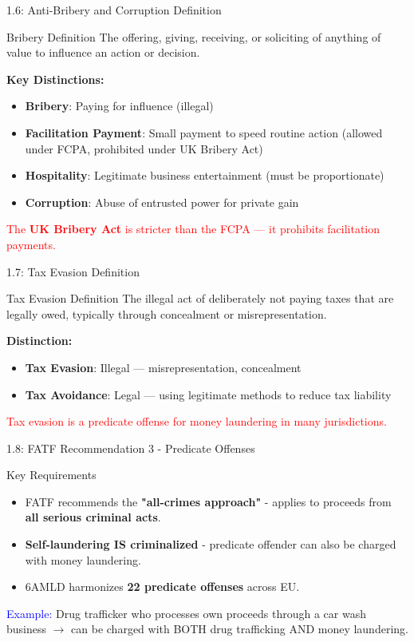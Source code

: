 \documentclass{beamer}
\begin{document}
	\begin{frame}{1.6: Anti-Bribery and Corruption Definition}
		\begin{block}{Bribery Definition}
			The offering, giving, receiving, or soliciting of anything of value to influence an action or decision.
		\end{block}
		\textbf{Key Distinctions:}
		\begin{itemize}
			\item \textbf{Bribery}: Paying for influence (illegal)
			\item \textbf{Facilitation Payment}: Small payment to speed routine action (allowed under FCPA, prohibited under UK Bribery Act)
			\item \textbf{Hospitality}: Legitimate business entertainment (must be proportionate)
			\item \textbf{Corruption}: Abuse of entrusted power for private gain
		\end{itemize}
		\textcolor{red}{The \textbf{UK Bribery Act} is stricter than the FCPA — it prohibits facilitation payments.}
	\end{frame}
	
	\begin{frame}{1.7: Tax Evasion Definition}
		\begin{block}{Tax Evasion Definition}
			The illegal act of deliberately not paying taxes that are legally owed, typically through concealment or misrepresentation.
		\end{block}
		\textbf{Distinction:}
		\begin{itemize}
			\item \textbf{Tax Evasion}: Illegal — misrepresentation, concealment
			\item \textbf{Tax Avoidance}: Legal — using legitimate methods to reduce tax liability
		\end{itemize}
		\textcolor{red}{Tax evasion is a predicate offense for money laundering in many jurisdictions.}
	\end{frame}
	
	\begin{frame}{1.8: FATF Recommendation 3 - Predicate Offenses}
		\begin{block}{Key Requirements}
			\begin{itemize}
				\item FATF recommends the \textbf{"all-crimes approach"} - applies to proceeds from \textbf{all serious criminal acts}.
				\item \textbf{Self-laundering IS criminalized} - predicate offender can also be charged with money laundering.
				\item 6AMLD harmonizes \textbf{22 predicate offenses} across EU.
			\end{itemize}
		\end{block}
		\textcolor{blue}{Example:} Drug trafficker who processes own proceeds through a car wash business $\rightarrow$ can be charged with BOTH drug trafficking AND money laundering.
	\end{frame}
	
\end{document}
